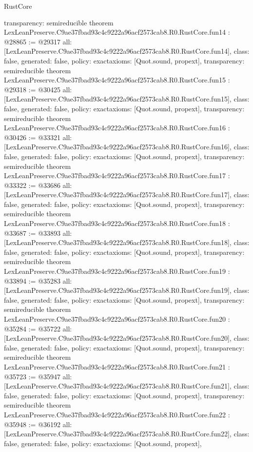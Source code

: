 \begin{lexlean}{RustCore}
\begin{coremodule}
{  transparency: semireducible
}
theorem LexLeanPreserve.C9ae37fbad93c4c9222a96acf2573cab8.R0.RustCore.fun14 : @28865 := @29317 {
  all: [LexLeanPreserve.C9ae37fbad93c4c9222a96acf2573cab8.R0.RustCore.fun14],
  class: false,
  generated: false,
  policy: exact{axioms: [Quot.sound, propext]},
  transparency: semireducible
}
theorem LexLeanPreserve.C9ae37fbad93c4c9222a96acf2573cab8.R0.RustCore.fun15 : @29318 := @30425 {
  all: [LexLeanPreserve.C9ae37fbad93c4c9222a96acf2573cab8.R0.RustCore.fun15],
  class: false,
  generated: false,
  policy: exact{axioms: [Quot.sound, propext]},
  transparency: semireducible
}
theorem LexLeanPreserve.C9ae37fbad93c4c9222a96acf2573cab8.R0.RustCore.fun16 : @30426 := @33321 {
  all: [LexLeanPreserve.C9ae37fbad93c4c9222a96acf2573cab8.R0.RustCore.fun16],
  class: false,
  generated: false,
  policy: exact{axioms: [Quot.sound, propext]},
  transparency: semireducible
}
theorem LexLeanPreserve.C9ae37fbad93c4c9222a96acf2573cab8.R0.RustCore.fun17 : @33322 := @33686 {
  all: [LexLeanPreserve.C9ae37fbad93c4c9222a96acf2573cab8.R0.RustCore.fun17],
  class: false,
  generated: false,
  policy: exact{axioms: [Quot.sound, propext]},
  transparency: semireducible
}
theorem LexLeanPreserve.C9ae37fbad93c4c9222a96acf2573cab8.R0.RustCore.fun18 : @33687 := @33893 {
  all: [LexLeanPreserve.C9ae37fbad93c4c9222a96acf2573cab8.R0.RustCore.fun18],
  class: false,
  generated: false,
  policy: exact{axioms: [Quot.sound, propext]},
  transparency: semireducible
}
theorem LexLeanPreserve.C9ae37fbad93c4c9222a96acf2573cab8.R0.RustCore.fun19 : @33894 := @35283 {
  all: [LexLeanPreserve.C9ae37fbad93c4c9222a96acf2573cab8.R0.RustCore.fun19],
  class: false,
  generated: false,
  policy: exact{axioms: [Quot.sound, propext]},
  transparency: semireducible
}
theorem LexLeanPreserve.C9ae37fbad93c4c9222a96acf2573cab8.R0.RustCore.fun20 : @35284 := @35722 {
  all: [LexLeanPreserve.C9ae37fbad93c4c9222a96acf2573cab8.R0.RustCore.fun20],
  class: false,
  generated: false,
  policy: exact{axioms: [Quot.sound, propext]},
  transparency: semireducible
}
theorem LexLeanPreserve.C9ae37fbad93c4c9222a96acf2573cab8.R0.RustCore.fun21 : @35723 := @35947 {
  all: [LexLeanPreserve.C9ae37fbad93c4c9222a96acf2573cab8.R0.RustCore.fun21],
  class: false,
  generated: false,
  policy: exact{axioms: [Quot.sound, propext]},
  transparency: semireducible
}
theorem LexLeanPreserve.C9ae37fbad93c4c9222a96acf2573cab8.R0.RustCore.fun22 : @35948 := @36192 {
  all: [LexLeanPreserve.C9ae37fbad93c4c9222a96acf2573cab8.R0.RustCore.fun22],
  class: false,
  generated: false,
  policy: exact{axioms: [Quot.sound, propext]},
}
\end{coremodule}
\end{lexlean}
